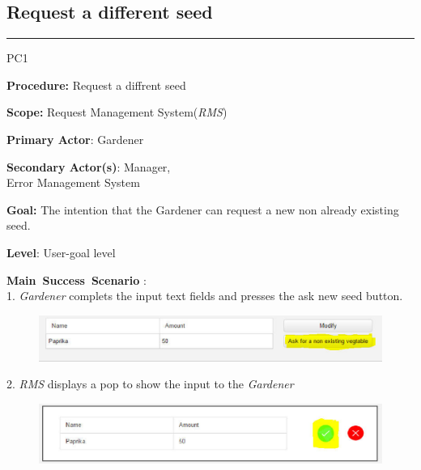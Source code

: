 \subsection{Request a different seed}
\vspace{0.5cm}
\hrule
\hfill
\begin{lyxlist}{PC1}
\small{
\item [\textbf{Procedure:}] Request a diffrent seed
\item [\textbf{Scope:}] Request Management System(\emph{RMS})
\item [\textbf{Primary Actor}:] Gardener
\item [\textbf{Secondary Actor(s)}:] Manager,\\
Error Management System
\item [\textbf{Goal:}] The intention that the Gardener can request a new
non already existing seed.
\item [\textbf{Level}:] User-goal level
\item [\textbf{Main~Success~Scenario}]:\\
1. \emph{Gardener} complets the input text fields and presses the ask new seed
button.\\
\item 
\begin{figure}[H]
\includegraphics[width=1\textwidth]{images/AskForANonExistingVegtable.eps}
\end{figure}
2. \emph{RMS} displays a pop to show the input to the \emph{Gardener}\\
 \begin{figure}[H]
\includegraphics[width=1\textwidth]{images/AskForANonExistingVegtablePopUp.eps}
\end{figure}

}
\end{lyxlist}
